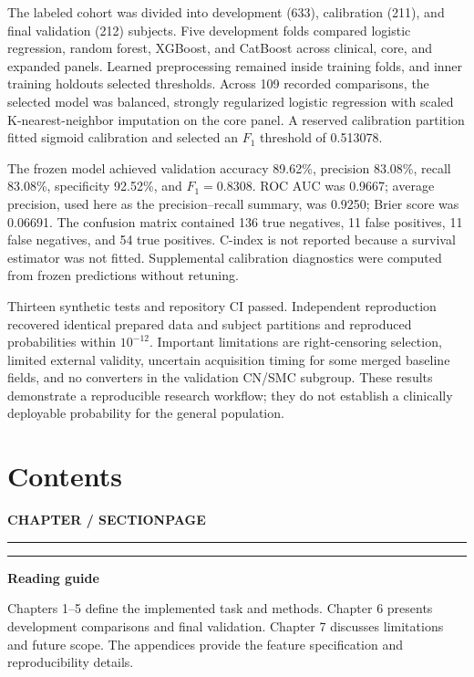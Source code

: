 \documentclass[11pt,a4paper]{article}
\begin{document}
The labeled cohort was divided into development (633), calibration (211), and final validation (212) subjects. Five development folds compared logistic regression, random forest, XGBoost, and CatBoost across clinical, core, and expanded panels. Learned preprocessing remained inside training folds, and inner training holdouts selected thresholds. Across 109 recorded comparisons, the selected model was balanced, strongly regularized logistic regression with scaled K-nearest-neighbor imputation on the core panel. A reserved calibration partition fitted sigmoid calibration and selected an $F_1$ threshold of 0.513078.

The frozen model achieved validation accuracy 89.62\%, precision 83.08\%, recall 83.08\%, specificity 92.52\%, and $F_1=0.8308$. ROC AUC was 0.9667; average precision, used here as the precision--recall summary, was 0.9250; Brier score was 0.06691. The confusion matrix contained 136 true negatives, 11 false positives, 11 false negatives, and 54 true positives. C-index is not reported because a survival estimator was not fitted. Supplemental calibration diagnostics were computed from frozen predictions without retuning.

Thirteen synthetic tests and repository CI passed. Independent reproduction recovered identical prepared data and subject partitions and reproduced probabilities within $10^{-12}$. Important limitations are right-censoring selection, limited external validity, uncertain acquisition timing for some merged baseline fields, and no converters in the validation CN/SMC subgroup. These results demonstrate a reproducible research workflow; they do not establish a clinically deployable probability for the general population.


\clearpage
\setcounter{tocdepth}{1}
\section*{Contents}
\vspace{3mm}
\noindent\textbf{CHAPTER / SECTION}\hfill\textbf{PAGE}\par
\vspace{1mm}\hrule\vspace{3mm}
\begingroup\hypersetup{linkcolor=black}
\makeatletter{}\makeatother
\endgroup
\vspace{7mm}\hrule
\vfill\textbf{Reading guide}\par
Chapters 1--5 define the implemented task and methods. Chapter 6 presents development comparisons and final validation. Chapter 7 discusses limitations and future scope. The appendices provide the feature specification and reproducibility details.
\end{document}
